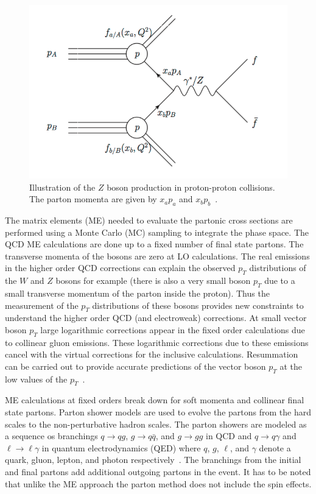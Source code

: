 \begin{figure}[h]
\centering
\includegraphics[width=0.60\columnwidth]{figures_chapter2/lhc_cross}
\caption{Illustration of the $Z$ boson production in proton-proton collisions. The parton momenta are given by $x_ap_a$ and $x_bp_b$~\cite{Schott:2014sea}.}
\label{fig:lhc_collision}
\end{figure} 

The matrix elements (ME) needed to evaluate the partonic cross sections are performed using a Monte Carlo (MC) sampling to integrate the phase space. The QCD ME calculations are done up to a fixed number of final state partons. The transverse momenta of the bosons are zero at LO calculations. The real emissions in the higher order QCD corrections can explain the observed $p_{T}$ distributions of the $W$ and $Z$ bosons for example (there is also a very small boson $p_{T}$ due to a small transverse momentum of the parton inside the proton). Thus the measurement of the $p_{T}$ distributions of these bosons provides new constraints to understand the higher order QCD (and electroweak) corrections. At small vector boson $p_{T}$ large logarithmic corrections appear in the fixed order calculations due to collinear gluon emissions. These logarithmic corrections due to these emissions cancel with the virtual corrections for the inclusive calculations. Resummation can be carried out to provide accurate predictions of the vector boson $p_{T}$ at the low values of the $p_T$~\cite{Laenen:1991af}.

ME calculations at fixed orders break down for soft momenta and collinear final state partons. Parton shower models are used to evolve the partons from the hard scales to the non-perturbative hadron scales. The parton showers are modeled as a sequence os branchings $q \rightarrow qg$, $g \rightarrow q\bar{q}$, and $g \rightarrow g g$ in QCD and $q \rightarrow q\gamma$ and $\ell \rightarrow \ell \gamma$ in quantum electrodynamics (QED) where $q$, $g$, $\ell$, and $\gamma$ denote a quark, gluon, lepton, and photon respectively~\cite{Schott:2014sea}. The branchings from the initial and final partons add additional outgoing partons in the event. It has to be noted that unlike the ME approach the parton method does not include the spin effects. 

